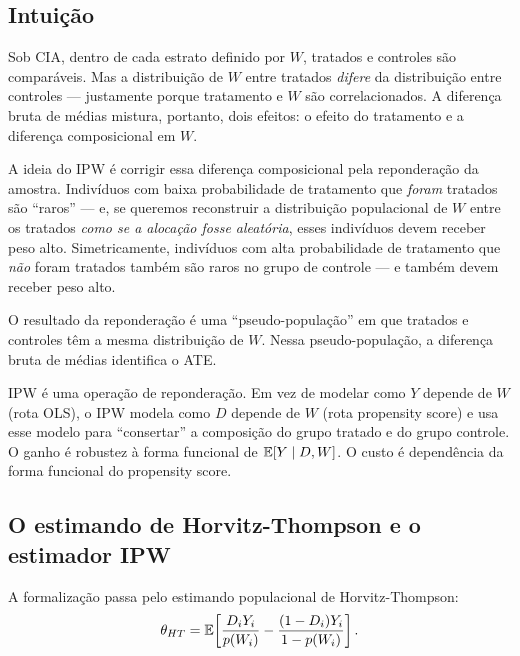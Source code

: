 \subsection*{Intuição}

Sob CIA, dentro de cada estrato definido por $W$, tratados e controles são comparáveis. Mas a distribuição de $W$ entre tratados \textit{difere} da distribuição entre controles --- justamente porque tratamento e $W$ são correlacionados. A diferença bruta de médias mistura, portanto, dois efeitos: o efeito do tratamento e a diferença composicional em $W$.

A ideia do IPW é corrigir essa diferença composicional pela reponderação da amostra. Indivíduos com baixa probabilidade de tratamento que \textit{foram} tratados são ``raros'' --- e, se queremos reconstruir a distribuição populacional de $W$ entre os tratados \textit{como se a alocação fosse aleatória}, esses indivíduos devem receber peso alto. Simetricamente, indivíduos com alta probabilidade de tratamento que \textit{não} foram tratados também são raros no grupo de controle --- e também devem receber peso alto.

O resultado da reponderação é uma ``pseudo-população'' em que tratados e controles têm a mesma distribuição de $W$. Nessa pseudo-população, a diferença bruta de médias identifica o ATE.

IPW é uma operação de reponderação. Em vez de modelar como $Y$ depende de $W$ (rota OLS), o IPW modela como $D$ depende de $W$ (rota propensity score) e usa esse modelo para ``consertar'' a composição do grupo tratado e do grupo controle. O ganho é robustez à forma funcional de $\mathbb{E}[Y \mid D, W]$. O custo é dependência da forma funcional do propensity score.

\subsection*{O estimando de Horvitz-Thompson e o estimador IPW}

A formalização passa pelo estimando populacional de Horvitz-Thompson:
\begin{equation}
\theta_{HT} = \mathbb{E}\!\left[\frac{D_i Y_i}{p(W_i)} - \frac{(1 - D_i) Y_i}{1 - p(W_i)}\right].
\label{eq:horvitz-thompson}
\end{equation}

